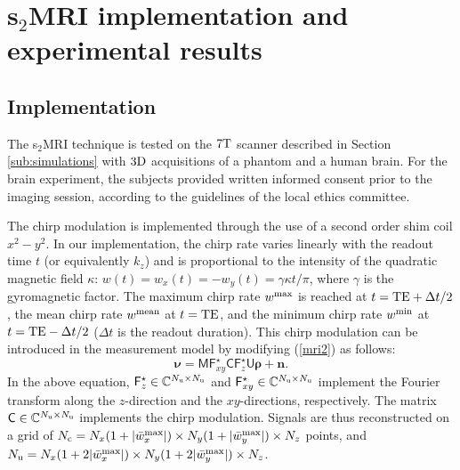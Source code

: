 \documentclass[10pt,draftcls, onecolumn]{IEEEtran}
\begin{document}
\section{s$_2$MRI implementation and experimental results}
\label{sec:Real acquisitions}

\subsection{Implementation}
The s$_2$MRI technique is tested on the $7\rm{T}$ scanner described in Section \ref{sub:simulations} with $3\rm{D}$ acquisitions of a phantom and a human brain. For the brain experiment, the subjects provided written informed consent prior to the imaging session, according to the guidelines of the local ethics committee.

The chirp modulation is implemented through the use of a second order shim coil $x^2-y^2$. In our implementation, the chirp rate varies linearly with the readout time $t$ (or equivalently $k_z$) and is proportional to the intensity of the quadratic magnetic field $\kappa$: $w(t) = w_x(t) = - w_y(t) = \gamma\kappa t / \pi $, where $\gamma$ is the gyromagnetic factor. The maximum chirp rate $w^{\rm max}$ is reached at $t = {\rm TE} + \Delta t/2$, the mean chirp rate $w^{\rm mean}$ at $t = {\rm TE}$, and the minimum chirp rate $w^{\rm min}$ at $t = {\rm TE} - \Delta t/2$ ($\Delta t$ is the readout duration). This chirp modulation can be introduced in the measurement model by modifying (\ref{mri2}) as follows:
\begin{equation}
\label{eq:real modulation}
\bm{\nu}=\mathsf{MF}^{\star}_{xy}\mathsf{CF}^{\star}_{z}\mathsf{U}\bm{\rho}+\bm{n}.
\end{equation}
In the above equation, $\mathsf{F}^{\star}_{z} \in \mathbb{C}^{N_{\rm u} \times N_{\rm u}}$ and $\mathsf{F}^{\star}_{xy} \in \mathbb{C}^{N_{\rm u} \times N_{\rm u}}$ implement the Fourier transform along the $z$-direction and the $xy$-directions, respectively. The matrix $\mathsf{C} \in \mathbb{C}^{N_{\rm u} \times N_{\rm u}}$ implements the chirp modulation. Signals are thus reconstructed on a grid of $N_{\rm c}=N_x(1+\vert\bar{w}_x^{\rm max}\vert)\times N_y(1+\vert\bar{w}_y^{\rm max}\vert)\times N_z$ points, and $N_{\rm u}=N_x(1+2\vert\bar{w}_x^{\rm max}\vert)\times N_y(1+2\vert\bar{w}_y^{\rm max}\vert)\times N_z$.
\end{document}

